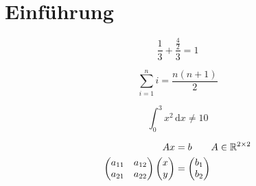 \documentclass[12pt,a4paper,final]{scrbook}
\begin{document}
\chapter{Einführung}

\begin{equation}
	\frac{1}{3} + \frac{\frac{4}{2}}{3} = 1
\end{equation}

\begin{equation}
	\sum \limits_{i=1}^n i = \frac{n(n+1)}{2}
\end{equation}

\begin{equation}
	\int_0^3 x^2 \,\mathrm{d}x \neq 10
\end{equation}

\begin{align}
	Ax&=b \qquad A \in \mathbb{R}^{2\times 2}\\
	\begin{pmatrix}
	a_{11} & a_{12} \\ a_{21} & a_{22}
	\end{pmatrix}
	\begin{pmatrix}
	x\\
	y
	\end{pmatrix} &=
	\begin{pmatrix}
	b_1\\
	b_2
	\end{pmatrix} \notag
\end{align}
\end{document}
